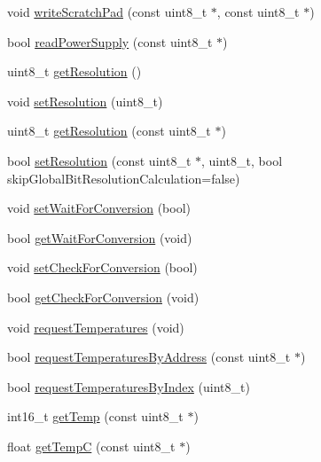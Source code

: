 \begin{DoxyCompactItemize}
\item 
void \hyperlink{class_dallas_temperature_a74c275dabf103f268c5a271d379dcb7e}{write\+Scratch\+Pad} (const uint8\+\_\+t $\ast$, const uint8\+\_\+t $\ast$)
\item 
bool \hyperlink{class_dallas_temperature_af6a28c1d1009dd6d010d97dffaf5942d}{read\+Power\+Supply} (const uint8\+\_\+t $\ast$)
\item 
uint8\+\_\+t \hyperlink{class_dallas_temperature_a9dac13206229d7c8fb75f21bf44e75ed}{get\+Resolution} ()
\item 
void \hyperlink{class_dallas_temperature_a43363ee4b227f1ecf9c33cd4e072c0c9}{set\+Resolution} (uint8\+\_\+t)
\item 
uint8\+\_\+t \hyperlink{class_dallas_temperature_a2266822561e864c4921955697c1ac7f5}{get\+Resolution} (const uint8\+\_\+t $\ast$)
\item 
bool \hyperlink{class_dallas_temperature_a394897437dfb8de4c8fd2198a1d1c356}{set\+Resolution} (const uint8\+\_\+t $\ast$, uint8\+\_\+t, bool skip\+Global\+Bit\+Resolution\+Calculation=false)
\item 
void \hyperlink{class_dallas_temperature_aa5f90d9f12327f39de97ed2244a4ad6f}{set\+Wait\+For\+Conversion} (bool)
\item 
bool \hyperlink{class_dallas_temperature_abb49c5903d68b86c0cf2da5e2b849a43}{get\+Wait\+For\+Conversion} (void)
\item 
void \hyperlink{class_dallas_temperature_ae8ef644d60236af12963f37fe145a49a}{set\+Check\+For\+Conversion} (bool)
\item 
bool \hyperlink{class_dallas_temperature_a7541728802904b0ed8d17a7f5ef00801}{get\+Check\+For\+Conversion} (void)
\item 
void \hyperlink{class_dallas_temperature_a5d28cff0d7e317c28e28c0f1a62fbe6d}{request\+Temperatures} (void)
\item 
bool \hyperlink{class_dallas_temperature_aee2a2abd5f8293df9a0a030b3e982c90}{request\+Temperatures\+By\+Address} (const uint8\+\_\+t $\ast$)
\item 
bool \hyperlink{class_dallas_temperature_ae9a7bf62321615519242d2421c8b349a}{request\+Temperatures\+By\+Index} (uint8\+\_\+t)
\item 
int16\+\_\+t \hyperlink{class_dallas_temperature_a37c3723cc15d5e46d0a6caa96a3c4781}{get\+Temp} (const uint8\+\_\+t $\ast$)
\item 
float \hyperlink{class_dallas_temperature_a20f94b59909b46e55a77b399d99591a2}{get\+TempC} (const uint8\+\_\+t $\ast$)
\item 

\end{DoxyCompactItemize}
